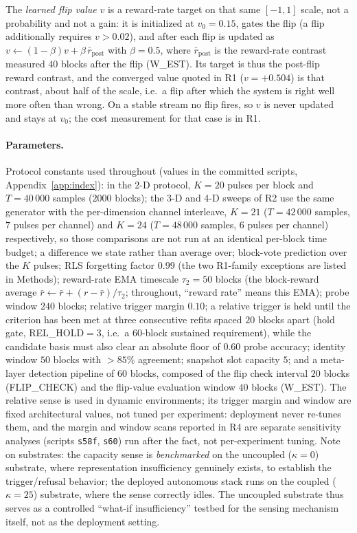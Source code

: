 \documentclass[preprint,12pt]{elsarticle}
\begin{document}
The \emph{learned
flip value} $v$ is a reward-rate target on that same $[-1,1]$ scale, not a
probability and not a gain: it is initialized at $v_0=0.15$, gates the flip
(a flip additionally requires $v>0.02$), and after each flip is updated as
$v\leftarrow(1-\beta)v+\beta\,\bar r_{\mathrm{post}}$ with $\beta=0.5$, where
$\bar r_{\mathrm{post}}$ is the reward-rate contrast measured $40$ blocks
after the flip (W\_EST). Its target is thus the post-flip reward contrast,
and the converged value quoted in R1 ($v=+0.504$) is that contrast, about
half of the scale, i.e.\ a flip after which the system is right well more
often than wrong. On a stable stream no flip fires, so $v$ is never updated
and stays at $v_0$; the cost measurement for that case is in R1.

\paragraph{Parameters.} Protocol constants used throughout (values in the
committed scripts, Appendix~\ref{app:index}): in the 2-D protocol,
$K=20$ pulses per block and $T=40\,000$ samples ($2000$ blocks); the 3-D and
4-D sweeps of R2 use the same generator with the per-dimension channel
interleave, $K=21$ ($T=42\,000$ samples, $7$ pulses per channel) and $K=24$
($T=48\,000$ samples, $6$ pulses per channel) respectively, so those
comparisons are not run at an identical per-block time budget; a
difference we state rather than average over; block-vote prediction over the $K$
pulses; RLS forgetting factor $0.99$ (the two R1-family exceptions are listed
in Methods); reward-rate EMA timescale
$\tau_2=50$ blocks (the block-reward average
$\bar r \leftarrow \bar r + (r - \bar r)/\tau_2$; throughout, ``reward
rate'' means this EMA); probe window $240$ blocks; relative trigger margin
$0.10$; a relative trigger is held until the criterion has been met at three
consecutive refits spaced $20$ blocks apart (hold gate, REL\_HOLD$=3$, i.e.\
a $60$-block sustained requirement), while the candidate basis must also
clear an absolute floor of $0.60$ probe accuracy; identity window $50$ blocks
with $>85\%$ agreement; snapshot slot
capacity $5$; and a meta-layer detection pipeline of $60$ blocks, composed of
the flip check interval $20$ blocks (FLIP\_CHECK) and the flip-value
evaluation window $40$ blocks (W\_EST). The relative sense is used in dynamic environments; its
trigger margin and window are fixed architectural values, not tuned per
experiment: deployment never re-tunes them, and the margin and window scans
reported in R4 are separate sensitivity analyses (scripts \texttt{s58f},
\texttt{s60}) run after the fact, not per-experiment tuning. Note on substrates: the capacity sense is \emph{benchmarked}
on the uncoupled ($\kappa=0$) substrate, where representation
insufficiency genuinely exists, to establish the trigger/refusal behavior;
the deployed autonomous stack runs on the coupled ($\kappa=25$) substrate,
where the sense correctly idles. The uncoupled substrate thus serves as a
controlled ``what-if insufficiency'' testbed for the sensing mechanism
itself, not as the deployment setting.
\end{document}

